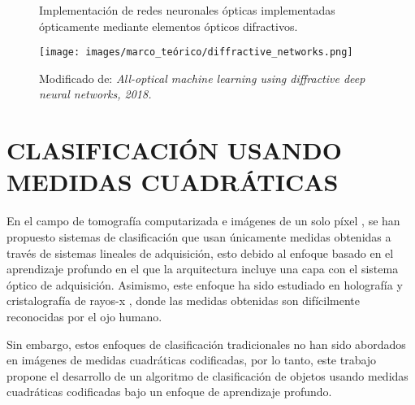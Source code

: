 \begin{figure}[!h]
    \centering
    \caption{Implementación de redes neuronales ópticas implementadas ópticamente mediante elementos ópticos difractivos.}
    \texttt{[image: images/marco\_teórico/diffractive\_networks.png]}
    \caption*{Modificado de: \textit{All-optical machine learning using diffractive deep neural networks, 2018.}}
    \label{fig:optical_networks}
\end{figure}

\section{CLASIFICACIÓN USANDO MEDIDAS CUADRÁTICAS}
En el campo de tomografía computarizada  e imágenes de un solo píxel , se han propuesto sistemas de clasificación que usan únicamente medidas obtenidas a través de sistemas lineales de adquisición, esto debido al enfoque basado en el aprendizaje profundo en el que la arquitectura incluye una capa con el sistema óptico de adquisición. Asimismo, este enfoque ha sido estudiado en holografía  y cristalografía de rayos-x , donde las medidas obtenidas son difícilmente reconocidas por el ojo humano. 

Sin embargo, estos enfoques de clasificación tradicionales no han sido abordados en imágenes de medidas cuadráticas codificadas, por lo tanto, este trabajo propone el desarrollo de un algoritmo de clasificación de objetos usando medidas cuadráticas codificadas bajo un enfoque de aprendizaje profundo. 




